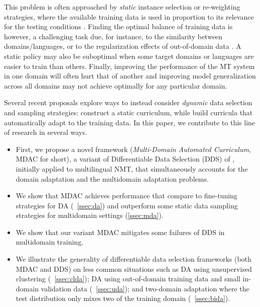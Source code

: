 \documentclass[11pt]{article}
\begin{document}
This problem is often approached by \emph{static} instance selection or re-weighting strategies, where the available training data is used in proportion to its relevance for the testing conditions \cite{Moore10selection,Axelrod11domain}. Finding the optimal balance of training data is however, a challenging task due, for instance, to the similarity between domains/languages, or to the regularization effects of out-of-domain data \cite{Miceli-barone17regularization}. A static policy may also be suboptimal when some target domains or languages are easier to train than others. Finally, improving the performance of the MT system in one domain will often hurt that of another \cite{Vanderwees17dynamic,Britz17mixing} and improving model generalization across all domains \cite{koehn18findings} may not achieve optimally for any particular domain. 

Several recent proposals
explore ways to instead consider \emph{dynamic} data selection and sampling strategies:  construct a static curriculum, while  build curricula that automatically adapt to the training data. In this paper, we contribute to this line of research in several ways. 
\begin{itemize}
	\item First, we propose a novel framework (\emph{Multi-Domain Automated Curriculum}, MDAC for short), a variant of Differentiable Data Selection (DDS) of , initially applied to multilingual NMT, that simultaneously accounts for the domain adaptation and the multidomain adaptation problems.
	\item We show that MDAC achieves performance that compare to fine-tuning strategies for DA (\textsection~\ref{ssec:da}) and outperform some static data sampling strategies for multidomain settings (\ref{ssec:mda}).
	\item We show that our variant MDAC mitigates some failures of DDS in multidomain training.
	\item We illustrate the generality of differentiable data selection frameworks (both MDAC and DDS) on less common situations such as DA using unsupervised clustering (\textsection~\ref{ssec:clda}); DA using out-of-domain training data and small in-domain validation data (\textsection~\ref{ssec:uda}); and two-domain adaptation where the test distribution only mixes two of the training domain (\textsection~\ref{ssec:bida}).
\end{itemize}
\end{document}
